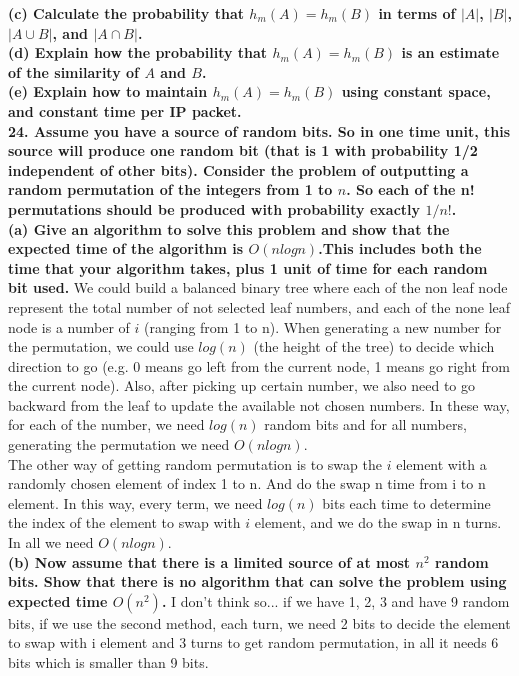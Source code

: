 \documentclass{article}
\begin{document}
\textbf{(c) Calculate the probability that $h_m(A) = h_m(B)$ in terms of $|A|$, $|B|$, $|A\cup B|$, and $|A\cap B|$.}\\ \newline
\textbf{(d) Explain how the probability that $h_m(A) = h_m(B)$ is an estimate of the similarity of $A$ and $B$.} \\ \newline
\textbf{(e) Explain how to maintain $h_m(A) = h_m(B)$ using constant space, and constant time per IP packet.} \\ \newline
\textbf{24. Assume you have a source of random bits. So in one time unit, this source will produce one random bit (that is 1 with probability 1/2 independent of other bits). Consider the problem of outputting a random permutation of the integers from 1 to $n$. So each of the n! permutations should be produced with probability exactly $1/n!$.} \\ \newline
\textbf{(a) Give an algorithm to solve this problem and show that the expected time of the algorithm is $O(nlogn)$.This includes both the time that your algorithm takes, plus 1 unit of time for each random bit used.} \newline
We could build a balanced binary tree where each of the non leaf node represent the total number of not selected leaf numbers, and each of the none leaf node is a number of $i$ (ranging from 1 to n). When generating a new number for the permutation, we could use $log(n)$ (the height of the tree) to decide which direction to go (e.g. 0 means go left from the current node, 1 means go right from the current node). Also, after picking up certain number, we also need to go backward from the leaf to update the available not chosen numbers. In these way, for each of the number, we need $log(n)$ random bits and for all numbers, generating the permutation we need $O(nlogn)$.
\\ \newline
\newline
The other way of getting random permutation is to swap the $i$ element with a randomly chosen element of index 1 to n. And do the swap n time from i to n element. In this way, every term, we need $log(n)$ bits each time to determine the index of the element to swap with $i$ element, and we do the swap in n turns. In all we need $O(nlogn)$.
\\ \newline
\textbf{(b) Now assume that there is a limited source of at most $n^2$ random bits. Show that there is no algorithm that can solve the problem using expected time $O(n^2)$.}
\newline
I don't think so... if we have 1, 2, 3 and have 9 random bits, if we use the second method, each turn, we need 2 bits to decide the element to swap with i element and 3 turns to get random permutation, in all it needs 6 bits which is smaller than 9 bits.
\end{document}
